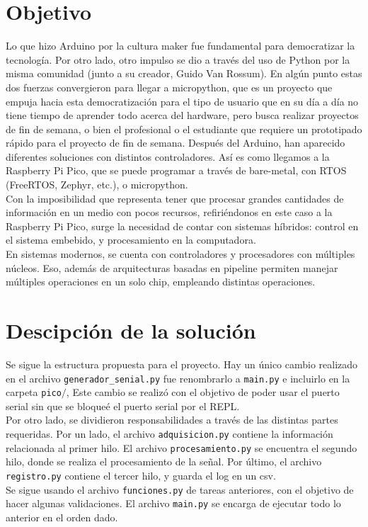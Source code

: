 \documentclass{assignment}
\begin{document}
	
	\section*{Objetivo}
	Lo que hizo Arduino por la cultura maker fue fundamental para democratizar la tecnología. Por otro lado, otro impulso se dio a través del uso de Python por la misma comunidad (junto a su creador, Guido Van Rossum). En algún punto estas dos fuerzas convergieron para llegar a micropython, que es un proyecto que empuja hacia esta democratización para el tipo de usuario que en su día a día no tiene tiempo de aprender todo acerca del hardware, pero busca realizar proyectos de fin de semana, o bien el profesional o el estudiante que requiere un prototipado rápido para el proyecto de fin de semana. Después del Arduino, han aparecido diferentes soluciones con distintos controladores. Así es como llegamos a la Raspberry Pi Pico, que se puede programar a través de bare-metal, con RTOS (FreeRTOS, Zephyr, etc.), o micropython.\\
	Con la imposibilidad que representa tener que procesar grandes cantidades de información en un medio con pocos recursos, refiriéndonos en este caso a la Raspberry Pi Pico, surge la necesidad de contar con sistemas híbridos: control en el sistema embebido, y procesamiento en la computadora.\\
	En sistemas modernos, se cuenta con controladores y procesadores con múltiples núcleos. Eso, además de arquitecturas basadas en pipeline permiten manejar múltiples operaciones en un solo chip, empleando distintas operaciones.
	\section*{Descipción de la solución}
	Se sigue la estructura propuesta para el proyecto. Hay un único cambio realizado en el archivo {\tt generador\_senial.py} fue renombrarlo a {\tt main.py} e incluirlo en la carpeta {\tt pico}$\slash$, Este cambio se realizó con el objetivo de poder usar el puerto serial sin que se bloqueé el puerto serial por el REPL.\\
	Por otro lado, se dividieron responsabilidades a través de las distintas partes requeridas. Por un lado, el archivo {\tt adquisicion.py} contiene la información relacionada al primer hilo. El archivo {\tt procesamiento.py} se encuentra el segundo hilo, donde se realiza el procesamiento  de la señal. Por último, el archivo {\tt registro.py} contiene el tercer hilo, y guarda el log en un csv.\\
	Se sigue usando el archivo {\tt funciones.py} de tareas anteriores, con el objetivo de hacer algunas validaciones. El archivo {\tt main.py} se encarga de ejecutar todo lo anterior en el orden dado.
\end{document}
